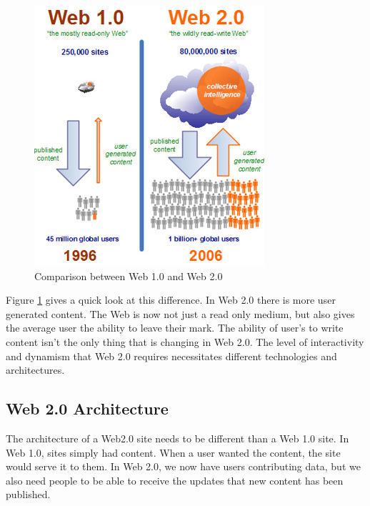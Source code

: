 \documentclass[12pt]{article}
\begin{document}
\begin{figure}[H]
  \begin{center}
    \includegraphics[scale=0.8]{web3_3.jpg}
    \caption{Comparison between Web 1.0 and Web 2.0}
    \label{fig:web3_3}
  \end{center}
\end{figure}

Figure \ref{fig:web3_3} gives a quick look at this difference.  In Web 2.0 there is more user generated content.  The Web is now not just a read only medium, but also gives the average user the ability to leave their mark.  The ability of user's to write content isn't the only thing that is changing in Web 2.0.  The level of interactivity and dynamism that Web 2.0 requires necessitates different technologies and architectures.

\subsection{Web 2.0 Architecture}
The architecture of a Web2.0 site needs to be different than a Web 1.0 site.  In Web 1.0, sites simply had content.  When a user wanted the content, the site would serve it to them. In Web 2.0, we now have users contributing data, but we also need people to be able to receive the updates that new content has been published.
\end{document}
